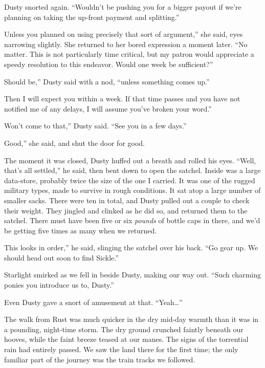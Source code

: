 Dusty snorted again. “Wouldn’t be pushing you for a bigger payout if we’re planning on taking the up-front payment and splitting.”

\leavevmode{}Unless you planned on using precisely that sort of argument,” she said, eyes narrowing slightly. She returned to her bored expression a moment later. “No matter. This is not particularly time critical, but my patron would appreciate a speedy resolution to this endeavor. Would one week be sufficient?”

\leavevmode{}Should be,” Dusty said with a nod, “unless something comes up.”

\leavevmode{}Then I will expect you within a week. If that time passes and you have not notified me of any delays, I will assume you’ve broken your word.”

\leavevmode{}Won’t come to that,” Dusty said. “See you in a few days.”

\leavevmode{}Good,” she said, and shut the door for good.

The moment it was closed, Dusty huffed out a breath and rolled his eyes. “Well, that’s all settled,” he said, then bent down to open the satchel. Inside was a large data-store, probably twice the size of the one I carried. It was one of the rugged military types, made to survive in rough conditions. It sat atop a large number of smaller sacks. There were ten in total, and Dusty pulled out a couple to check their weight. They jingled and clinked as he did so, and returned them to the satchel. There must have been five or six \textit{pounds} of bottle caps in there, and we’d be getting five times as many when we returned.

\leavevmode{}This looks in order,” he said, slinging the satchel over his back. “Go gear up. We should head out soon to find Sickle.”

Starlight smirked as we fell in beside Dusty, making our way out. “Such charming ponies you introduce us to, Dusty.”

Even Dusty gave a snort of amusement at that. “Yeah…”

{\br}%
The walk from Rust was much quicker in the dry mid-day warmth than it was in a pounding, night-time storm. The dry ground crunched faintly beneath our hooves, while the faint breeze teased at our manes. The signs of the torrential rain had entirely passed. We saw the land there for the first time; the only familiar part of the journey was the train tracks we followed.

